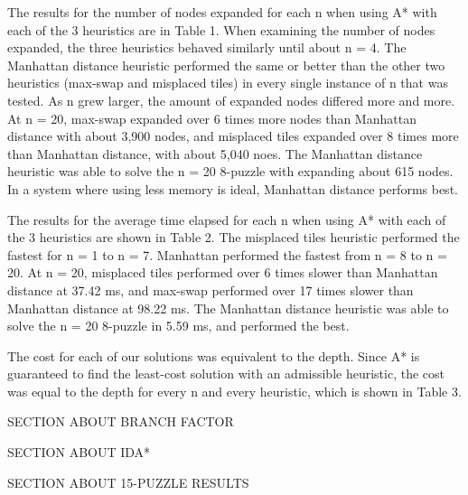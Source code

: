 \documentclass{article}
\begin{document}
		The results for the number of nodes expanded for each n when using A* with each of the 3 heuristics are in Table 1. When examining the number of nodes expanded, the three heuristics behaved similarly until about n = 4. The Manhattan distance heuristic performed the same or better than the other two heuristics (max-swap and misplaced tiles) in every single instance of n that was tested. As n grew larger, the amount of expanded nodes differed more and more. At n = 20, max-swap expanded over 6 times more nodes than Manhattan distance with about 3,900 nodes, and misplaced tiles expanded over 8 times more than Manhattan distance, with about 5,040 noes. The Manhattan distance heuristic was able to solve the n = 20 8-puzzle with expanding about 615 nodes. In a system where using less memory is ideal, Manhattan distance performs best. \par
		
		The results for the average time elapsed for each n when using A* with each of the 3 heuristics are shown in Table 2. The misplaced tiles heuristic performed the fastest for n = 1 to n = 7. Manhattan performed the fastest from n = 8 to n = 20. At n = 20, misplaced tiles performed over 6 times slower than Manhattan distance at 37.42 ms, and max-swap performed over 17 times slower than Manhattan distance at 98.22 ms. The Manhattan distance heuristic was able to solve the n = 20 8-puzzle in 5.59 ms, and performed the best. \par
		
		The cost for each of our solutions was equivalent to the depth. Since A* is guaranteed to find the least-cost solution with an admissible heuristic, the cost was equal to the depth for every n and every heuristic, which is shown in Table 3. \par
		
		SECTION ABOUT BRANCH FACTOR \par
		
		SECTION ABOUT IDA* \par
		
		SECTION ABOUT 15-PUZZLE RESULTS \par
	   
	   
\end{document}
